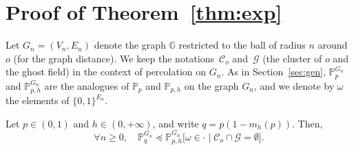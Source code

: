 \documentclass[AHL,Unicode,longabstracts,published]{cedram}
\newcommand{\G}{\mathbb{G}}
\newcommand{\Pro}{\mathbb{P}}
\newcommand{\calC}{\mathcal{C}}
\newcommand{\calG}{\mathcal{G}}
\let\oldforall\forall
\renewcommand*{\forall}{\mathrel{\oldforall}}
\begin{document}
\section{Proof of Theorem~\ref{thm:exp}}\label{sec:proof}

Let $G_n=(V_n,E_n)$ denote the graph $\G$ restricted to the ball of radius $n$ around~$o$ (for the graph distance). We keep the notations~$\calC_o$ and~$\calG$ (the cluster of $o$ and the ghost field) in the context of percolation on $G_n$. As in Section~\ref{sec:gen}, $\Pro_{p}^{G_n}$ and $\Pro_{p,h}^{G_n}$ are the analogues of $\Pro_p$ and $\Pro_{p,h}$ on the graph $G_n$, and we denote by $\omega$ the elements of $\{0,1\}^{E_n}$.

\begin{lemm}\label{lem:coupl_perco}
Let $p \in (0,1)$ and $h \in (0,+\infty)$, and write $q=p(1-m_h(p))$. Then,
\[
\forall n \ge 0, \quad \Pro_{q}^{G_n} \preceq \Pro_{p,h}^{G_n} \big[\omega \in \cdot \; \big| \; \calC_o \cap \calG = \emptyset \big].
\]
\end{lemm}
\end{document}
